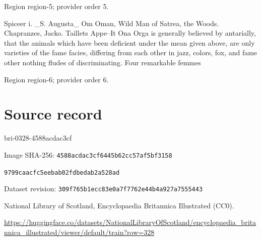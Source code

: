 \documentclass[11pt]{article}
\begin{document}
\par

{\scriptsize\color{gray} Region region-5; provider order 5.\par}
\medskip

Spiceer i. \_S. Augusta\_ Om Oman, Wild Man of Satrea, the Woods. Chapranzes, Jacko. Taillets Appe--It Ona Orga is generally believed by antarially, that the animals which have been deficient under the mean given above, are only varieties of the fame facies, differing from each other in jazz, colors, fox, and fame other nothing fludes of discriminating. Four remarkable femmes
\par

{\scriptsize\color{gray} Region region-6; provider order 6.\par}
\medskip
\newpage\section*{Source record}
bri-0328-4588acdac3cf\par
Image SHA-256: \texttt{4588acdac3cf6445b62cc57af5bf3158}\par\texttt{9799caacfc5eebab02fdbedab2a528ad}\par
Dataset revision: \texttt{309f765b1ecc83e0a7f7}\texttt{762e44b4a927a7555443}\par
National Library of Scotland, Encyclopaedia Britannica Illustrated (CC0).\par
\url{https://huggingface.co/datasets/NationalLibraryOfScotland/encyclopaedia_britannica_illustrated/viewer/default/train?row=328}
\end{document}
